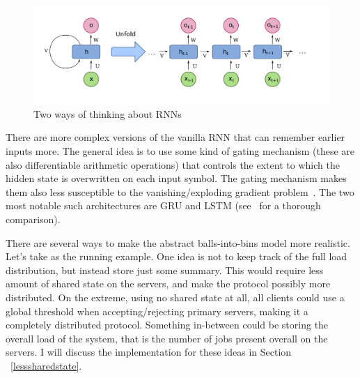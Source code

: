 \begin{figure}[hbt!] \label{RNN-image}
    \centering
    \includegraphics[scale=0.2]{Chapter2/Figs/RNN.png}
    \caption{Two ways of thinking about RNNs~\cite{RNN}}
\end{figure}



There are more complex versions of the vanilla RNN that can remember earlier inputs more. The general idea is to use some kind of gating mechanism (these are also differentiable arithmetic operations) that controls the extent to which the hidden state is overwritten on each input symbol. The gating mechanism makes them also less susceptible to the vanishing/exploding gradient problem~\cite{noh2021rnnvanishinggradient}. The two most notable such architectures are GRU and LSTM (see~\cite{shewalkar2019rnngrulstm} for a thorough comparison).


\iffalse
There are several ways to make the abstract balls-into-bins model more realistic. Let's take \TwoThinning as the running example. One idea is not to keep track of the full load distribution, but instead store just some summary. This would require less amount of shared state on the servers, and make the protocol possibly more distributed. On the extreme, using no shared state at all, all clients could use a global threshold when accepting/rejecting primary servers, making it a completely distributed protocol. Something in-between could be storing the overall load of the system, that is the number of jobs present overall on the servers. I will discuss the implementation for these ideas in Section ~\ref{lesssharedstate}.


